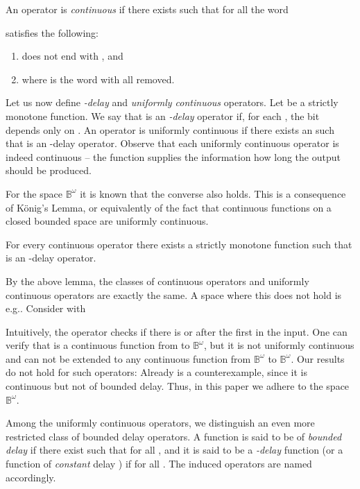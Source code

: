 \documentclass[fleqn,envcountsame]{LMCS}
\newcommand{\Bom}{\ensuremath{\mathbb{B}^{\omega}}\xspace}
\newcommand{\eg}{e.g.\xspace}
\begin{document}
\begin{defi}\label{def:continuous_to_delay}
An operator  is \emph{continuous}
if there exists 
such that for all  the word

satisfies the following:
\begin{enumerate}[(1)]
\item  does not end with , and
\item  where  is
the word  with all  removed.
\end{enumerate}
\end{defi}

Let us now define \emph{-delay} and \emph{uniformly continuous}
operators. Let  be a strictly monotone function.
We say that  is an \emph{-delay} operator if,
for each , the bit  depends only
on . An operator  is uniformly continuous
if there exists an  such that  is an -delay operator.
Observe that each uniformly continuous operator is indeed continuous --
the function  supplies the information 
how long the output  should be produced. 


For the space \Bom it is known that
the converse also holds. This is a consequence of K\"onig's Lemma, or
equivalently of the fact that continuous functions
on a closed bounded space are uniformly continuous.

\begin{lem}\label{lem:continuous_to_delay_operator}
For every continuous operator  there exists
a strictly monotone function  such that  is
an -delay operator.
\end{lem}

By the above lemma, the classes of continuous operators  and
uniformly continuous operators  are exactly the same.
A space where this does not hold is \eg .
Consider  with

Intuitively, the operator  checks if there is  or 
after the first  in the input. One can verify that  is
a continuous function from  to \Bom, but
it is not uniformly continuous and can not be extended to any continuous
function from \Bom to \Bom. Our results do not hold for such operators:
Already  is a counterexample, since it is continuous
but not of bounded delay. Thus, in this paper we adhere to the space \Bom.

Among the uniformly continuous operators, we distinguish an even more
restricted class of bounded delay operators. A function 
is said to be of \emph{bounded delay} if there exist 
such that  for all , and it is said to be
a \emph{-delay} function (or a function of \emph{constant} delay )
if  for all . The induced operators are named accordingly.
\end{document}
